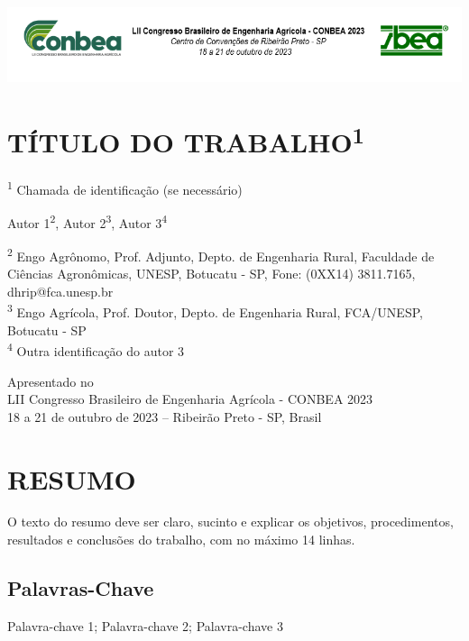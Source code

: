 \documentclass[a4paper]{article}
\begin{document}
	
	\begin{center}
		\includegraphics[width=\textwidth]{cabecalho}
	\end{center}
	
	\section*{\centering TÍTULO DO TRABALHO\textsuperscript{1}}
	\textsuperscript{1} Chamada de identificação (se necessário)
	
	\begin{center}
		\large
		Autor 1\textsuperscript{2}, Autor 2\textsuperscript{3}, Autor 3\textsuperscript{4}
	\end{center}
	
	\begin{center}
		\footnotesize
		\textsuperscript{2} Engo Agrônomo, Prof. Adjunto, Depto. de Engenharia Rural, Faculdade de Ciências Agronômicas, UNESP, Botucatu - SP, Fone: (0XX14) 3811.7165, dhrip@fca.unesp.br \\
		\textsuperscript{3} Engo Agrícola, Prof. Doutor, Depto. de Engenharia Rural, FCA/UNESP, Botucatu - SP \\
		\textsuperscript{4} Outra identificação do autor 3
	\end{center}
	
	\begin{center}
		Apresentado no \\
		LII Congresso Brasileiro de Engenharia Agrícola - CONBEA 2023 \\
		18 a 21 de outubro de 2023 – Ribeirão Preto - SP, Brasil
	\end{center}
	
	\section*{RESUMO}
	O texto do resumo deve ser claro, sucinto e explicar os objetivos, procedimentos, resultados e conclusões do trabalho, com no máximo 14 linhas.
	
	\subsection*{Palavras-Chave}
	Palavra-chave 1; Palavra-chave 2; Palavra-chave 3
	
\end{document}
